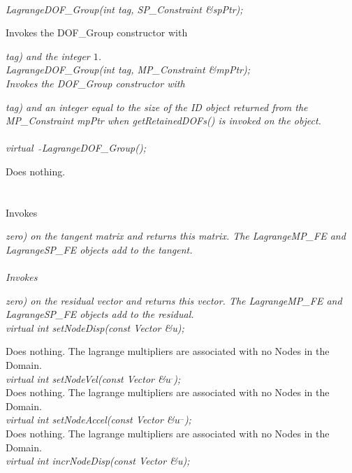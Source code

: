   \\
{\em LagrangeDOF\_Group(int tag, SP\_Constraint \&spPtr);}  

Invokes the DOF\_Group constructor with {\em tag) and the integer $1$. \\

{\em LagrangeDOF\_Group(int tag, MP\_Constraint \&mpPtr);}  \\ 

Invokes the DOF\_Group constructor with {\em tag) and an integer equal
to the size of the ID object returned from the MP\_Constraint {\em
mpPtr} when {\em getRetainedDOFs()} is invoked on the object. \\

  \\
{\em virtual~ $\tilde{}$LagrangeDOF\_Group();}  

Does nothing. \\

 \\
 \\
Invokes {\em zero{}) on the tangent matrix and returns this matrix. 
The LagrangeMP\_FE and LagrangeSP\_FE objects add to the tangent. \\


\\
Invokes {\em zero{}) on the residual vector and returns this vector. 
The LagrangeMP\_FE and LagrangeSP\_FE objects add to the residual. \\

{\em virtual int setNodeDisp(const Vector \&u);} 

Does nothing. The lagrange multipliers are associated with no Nodes
in the Domain. \\


{\em virtual int setNodeVel(const Vector \&$u^{.}$);}\\
Does nothing. The lagrange multipliers are associated with no Nodes
in the Domain. \\

{\em virtual int setNodeAccel(const Vector \&$u^{..}$);}\\
Does nothing. The lagrange multipliers are associated with no Nodes
in the Domain. \\

{\em virtual int incrNodeDisp(const Vector \&u);} 

}}}}
